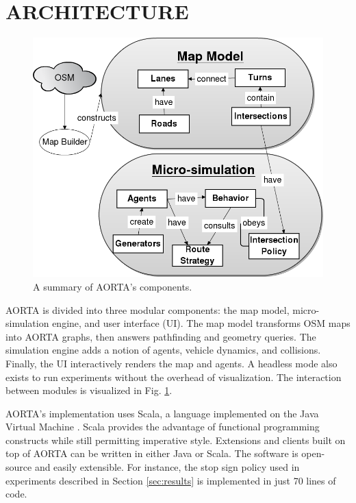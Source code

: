 \documentclass[letterpaper, 10 pt, conference]{ieeeconf}  %
\begin{document}
\section{ARCHITECTURE}
\label{sec:arch}

\begin{figure}
  \centering \includegraphics[scale=0.3]{architecture.png}
  \caption{A summary of AORTA's components.}
  \label{fig:arch}
  \vspace{-15pt}
\end{figure}

AORTA is divided into three modular components: the map model, micro-simulation
engine, and user interface (UI). The map model transforms OSM maps into AORTA
graphs, then answers pathfinding and geometry queries. The simulation engine
adds a notion of agents, vehicle dynamics, and collisions. Finally, the UI
interactively renders the map and agents. A headless mode also exists to run
experiments without the overhead of visualization. The interaction between
modules is visualized in Fig. \ref{fig:arch}.

AORTA's implementation uses Scala, a language implemented on the Java Virtual
Machine \cite{scala}. Scala provides the advantage of functional programming
constructs while still permitting imperative style.  Extensions and clients
built on top of AORTA can be written in either Java or Scala. The software is
open-source and easily extensible. For instance, the stop sign policy used
in experiments described in Section \ref{sec:results} is implemented in just 70
lines of code. 
\end{document}

